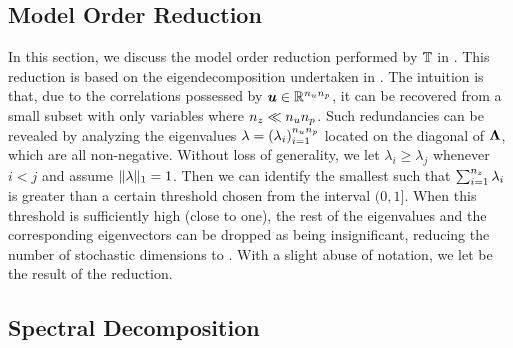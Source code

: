 \subsection{Model Order Reduction}

In this section, we discuss the model order reduction performed by $\transform$
in . This reduction is based on the eigendecomposition
undertaken in . The intuition is that, due to
the correlations possessed by $\vu \in \real^{\nu \np}$, it can be recovered
from a small subset with only \nz variables where $\nz \ll \nu \np$. Such
redundancies can be revealed by analyzing the eigenvalues $\m{\lambda} =
(\lambda_i)_{i = 1}^{\nu \np}$ located on the diagonal of $\m{\Lambda}$, which
are all non-negative. Without loss of generality, we let $\lambda_i \geq
\lambda_j$ whenever $i < j$ and assume $\norm[1]{\m{\lambda}} = 1$. Then we can
identify the smallest \nz such that $\sum_{i = 1}^\nz \lambda_i$ is greater than
a certain threshold chosen from the interval $(0, 1]$. When this threshold is
sufficiently high (close to one), the rest of the eigenvalues and the
corresponding eigenvectors can be dropped as being insignificant, reducing the
number of stochastic dimensions to \nz. With a slight abuse of notation, we let
\vz be the result of the reduction.

\subsection{Spectral Decomposition}

